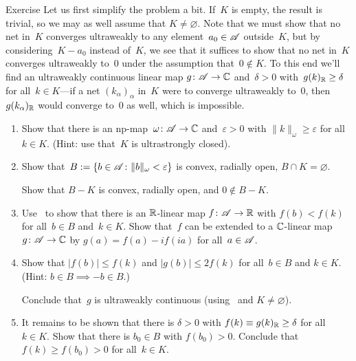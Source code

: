 \documentclass[a]{subfiles}
\begin{document}
\begin{parsec}
\begin{point}[ultraclosed]{Exercise}
Let us first simplify the problem a bit.
If~$K$ is empty, the result is trivial,
so we may as well assume that $K\neq \varnothing$.
Note that we must show that no net in~$K$ converges ultraweakly
to any element~$a_0\in\mathscr{A}$ outside~$K$,
but by considering~$K-a_0$ instead of~$K$,
we see that it suffices to show that
no net in~$K$ converges ultraweakly to~$0$
under the assumption that~$0\notin K$.
To this end we'll find an ultraweakly continuous linear map
$g\colon \mathscr{A}\to \mathbb{C}$ and~$\delta>0$ 
with~$g(k)_{\mathbb{R}}\geq \delta$ for all~$k\in K$---if
a net $(k_\alpha)_\alpha$ in~$K$ were to converge ultraweakly to~$0$,
then~$g(k_\alpha)_{\mathbb{R}}$ would converge to~$0$ as well,
which is impossible.
\begin{enumerate}
\item
	Show that 
	there is an np-map~$\omega \colon\mathscr{A}\to\mathbb{C}$
	and~$\varepsilon>0$ 
	with $\|k\|_\omega \geq \varepsilon$ for all~$k\in K$.
	(Hint: use that~$K$ is ultrastrongly closed).
\item
	Show that~$B:= \{ b\in \mathscr{A}\colon \|b\|_\omega < \varepsilon\}$
	 is convex, radially open, $B\cap K=\varnothing$.

	Show that $B-K$ is convex, radially open, and $0\notin B-K$.
\item
	Use~ to show that
	 there is an $\mathbb{R}$-linear map $f\colon \mathscr{A}\to \mathbb{R}$
	with $f(b)<f(k)$ for all~$b\in B$ and~$k\in K$.
	Show that~$f$
	can be extended to a $\mathbb{C}$-linear map
	$g \colon \mathscr{A}\to \mathbb{C}$
	by $g(a)= f(a)-if(ia)$ for all~$a\in\mathscr{A}$.
\item
	Show that $\left| f(b)\right| \leq f(k)$ 
	and $\left|g(b)\right|\leq 2f(k)$
	for all~$b\in B$ and $k\in K$.\\
	(Hint: $b\in B\implies -b\in B$.)

	Conclude that~$g$ is ultraweakly continuous
	(using~ and $K\neq \varnothing$).
\item
	It remains to be shown that
	there is $\delta>0$ with $f(k)\equiv g(k)_{\mathbb{R}}\geq \delta$
	for all~$k\in K$.
	Show that there is $b_0\in B$
	with $f(b_0) >0$.
	Conclude that $f(k)\geq f(b_0)>0 $ for all~$k\in K$.
\end{enumerate}
\end{point}
\end{parsec}
\end{document}
